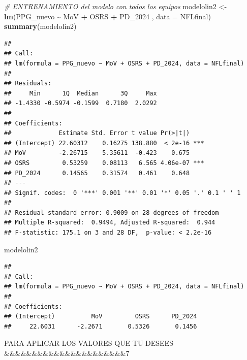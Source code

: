 \documentclass[
]{article}
\newenvironment{Shaded}{\begin{snugshade}}{\end{snugshade}}
\newcommand{\AttributeTok}[1]{\textcolor[rgb]{0.13,0.29,0.53}{#1}}
\newcommand{\CommentTok}[1]{\textcolor[rgb]{0.56,0.35,0.01}{\textit{#1}}}
\newcommand{\FunctionTok}[1]{\textcolor[rgb]{0.13,0.29,0.53}{\textbf{#1}}}
\newcommand{\NormalTok}[1]{#1}
\newcommand{\OtherTok}[1]{\textcolor[rgb]{0.56,0.35,0.01}{#1}}
\newcommand{\SpecialCharTok}[1]{\textcolor[rgb]{0.81,0.36,0.00}{\textbf{#1}}}
\begin{document}
\begin{Shaded}
\begin{Highlighting}[]
\CommentTok{\# ENTRENAMIENTO del modelo con todos los equipos}
\NormalTok{modelolin2 }\OtherTok{\textless{}{-}} \FunctionTok{lm}\NormalTok{(PPG\_nuevo }\SpecialCharTok{\textasciitilde{}}\NormalTok{ MoV  }\SpecialCharTok{+}\NormalTok{ OSRS }\SpecialCharTok{+}\NormalTok{ PD\_2024 , }\AttributeTok{data =}\NormalTok{ NFLfinal)}
\FunctionTok{summary}\NormalTok{(modelolin2)}
\end{Highlighting}
\end{Shaded}

\begin{verbatim}
## 
## Call:
## lm(formula = PPG_nuevo ~ MoV + OSRS + PD_2024, data = NFLfinal)
## 
## Residuals:
##     Min      1Q  Median      3Q     Max 
## -1.4330 -0.5974 -0.1599  0.7180  2.0292 
## 
## Coefficients:
##             Estimate Std. Error t value Pr(>|t|)    
## (Intercept) 22.60312    0.16275 138.880  < 2e-16 ***
## MoV         -2.26715    5.35611  -0.423    0.675    
## OSRS         0.53259    0.08113   6.565 4.06e-07 ***
## PD_2024      0.14565    0.31574   0.461    0.648    
## ---
## Signif. codes:  0 '***' 0.001 '**' 0.01 '*' 0.05 '.' 0.1 ' ' 1
## 
## Residual standard error: 0.9009 on 28 degrees of freedom
## Multiple R-squared:  0.9494, Adjusted R-squared:  0.944 
## F-statistic: 175.1 on 3 and 28 DF,  p-value: < 2.2e-16
\end{verbatim}

\begin{Shaded}
\begin{Highlighting}[]
\NormalTok{modelolin2}
\end{Highlighting}
\end{Shaded}

\begin{verbatim}
## 
## Call:
## lm(formula = PPG_nuevo ~ MoV + OSRS + PD_2024, data = NFLfinal)
## 
## Coefficients:
## (Intercept)          MoV         OSRS      PD_2024  
##     22.6031      -2.2671       0.5326       0.1456
\end{verbatim}

PARA APLICAR LOS VALORES QUE TU DESEES
\&\&\&\&\&\&\&\&\&\&\&\&\&\&\&\&\&\&\&\&\&\&7
\end{document}
